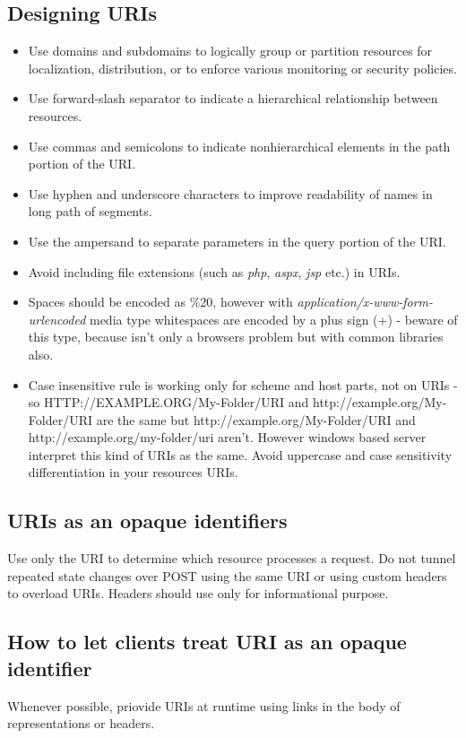 \documentclass[11pt,a4paper]{article}
\begin{document}
\subsection{Designing URIs}
\begin{itemize}
	\item Use domains and subdomains to logically group or partition resources for localization, distribution, or to enforce various monitoring or security policies.
	\item Use forward-slash separator to indicate a hierarchical relationship between resources.
	\item Use commas and semicolons to indicate nonhierarchical elements in the path portion of the URI.
	\item Use hyphen and underscore characters to improve readability of names in long path of segments.
	\item Use the ampersand to separate parameters in the query portion of the URI.
	\item Avoid including file extensions (such as \textit{php}, \textit{aspx}, \textit{jsp} etc.) in URIs.
	\item Spaces should be encoded as \%20, however with \textit{application/x-www-form-urlencoded} media type whitespaces are encoded by a plus sign (+) - beware of this type, because isn't only a browsers problem but with common libraries also.
	\item Case insensitive rule is working only for scheme and host parts, not on URIs - so HTTP://EXAMPLE.ORG/My-Folder/URI and http://example.org/My-Folder/URI are the same but http://example.org/My-Folder/URI and http://example.org/my-folder/uri aren't. However windows based server interpret this kind of URIs as the same. Avoid uppercase and case sensitivity differentiation in your resources URIs.
\end{itemize}

\subsection{URIs as an opaque identifiers}
Use only the URI to determine which resource processes a request. Do not tunnel repeated state changes over POST using the same URI or using custom headers to overload URIs. Headers should use only for informational purpose.

\subsection{How to let clients treat URI as an opaque identifier}
Whenever possible, priovide URIs at runtime using links in the body of representations or headers.
\end{document}
